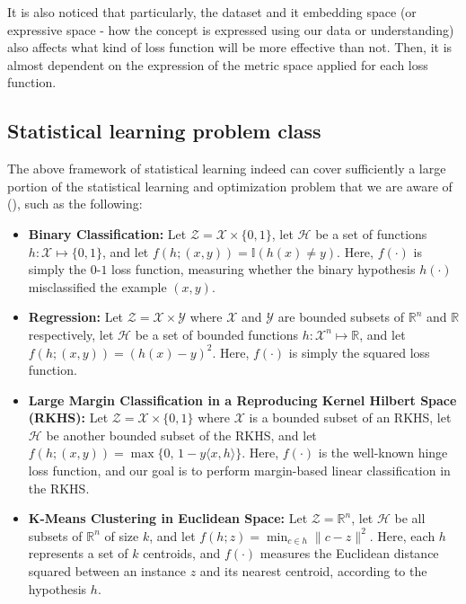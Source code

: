It is also noticed that particularly, the dataset and it embedding space (or expressive space - how the concept is expressed using our data or understanding) also affects what kind of loss function will be more effective than not. Then, it is almost dependent on the expression of the metric space applied for each loss function. 
\subsection{Statistical learning problem class}

The above framework of statistical learning indeed can cover sufficiently a large portion of the statistical learning and optimization problem that we are aware of (\cite{JMLR:v11:shalev-shwartz10a}), such as the following: 

\begin{itemize}[itemsep=2pt,topsep=1pt]
    \item \textbf{Binary Classification:} Let $\mathcal{Z} = \mathcal{X} \times \{0,1\}$, let $\mathcal{H}$ be a set of functions $h : \mathcal{X} \mapsto \{0,1\}$, and let $f(h;(x,y)) = \mathbb{I}\!\left(h(x) \neq y\right)$. Here, $f(\cdot)$ is simply the $0$-$1$ loss function, measuring whether the binary hypothesis $h(\cdot)$ misclassified the example $(x,y)$.
    \item \textbf{Regression:} Let $\mathcal{Z} = \mathcal{X} \times \mathcal{Y}$ where $\mathcal{X}$ and $\mathcal{Y}$ are bounded subsets of $\mathbb{R}^n$ and $\mathbb{R}$ respectively, let $\mathcal{H}$ be a set of bounded functions $h : \mathcal{X}^n \mapsto \mathbb{R}$, and let $f(h;(x,y)) = \left(h(x)-y\right)^2$. Here, $f(\cdot)$ is simply the squared loss function.
    \item \textbf{Large Margin Classification in a Reproducing Kernel Hilbert Space (RKHS):} Let $\mathcal{Z} = \mathcal{X} \times \{0,1\}$ where $\mathcal{X}$ is a bounded subset of an RKHS, let $\mathcal{H}$ be another bounded subset of the RKHS, and let $f(h;(x,y)) = \max\{0,\,1-y\langle x,h\rangle\}$. Here, $f(\cdot)$ is the well-known hinge loss function, and our goal is to perform margin-based linear classification in the RKHS.
    \item \textbf{K-Means Clustering in Euclidean Space:} Let $\mathcal{Z} = \mathbb{R}^n$, let $\mathcal{H}$ be all subsets of $\mathbb{R}^n$ of size $k$, and let $f(h;z) = \min_{c \in h}\|c-z\|^2$. Here, each $h$ represents a set of $k$ centroids, and $f(\cdot)$ measures the Euclidean distance squared between an instance $z$ and its nearest centroid, according to the hypothesis $h$.

\end{itemize}
